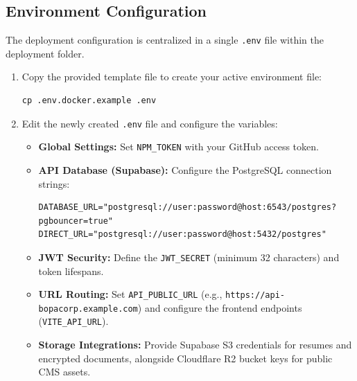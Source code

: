 \documentclass[letterpaper%
, oneside%
, 12pt%
, memoireprojet%
, english%
,creativecommons,hyperref, withAlgo2e %
]{thETS}
\begin{document}
\subsection{Environment Configuration}
The deployment configuration is centralized in a single \texttt{.env} file within the deployment folder.
\begin{enumerate}
\item Copy the provided template file to create your active environment file:
\begin{verbatim}
cp .env.docker.example .env
\end{verbatim}
\item Edit the newly created \texttt{.env} file and configure the variables:
\newline
\begin{itemize}
\item \textbf{Global Settings:} Set \texttt{NPM\_TOKEN} with your GitHub access token.
\item \textbf{API Database (Supabase):} Configure the PostgreSQL connection strings:
\begin{verbatim}
DATABASE_URL="postgresql://user:password@host:6543/postgres?pgbouncer=true"
DIRECT_URL="postgresql://user:password@host:5432/postgres"
\end{verbatim}
\item \textbf{JWT Security:} Define the \texttt{JWT\_SECRET} (minimum 32 characters) and token lifespans.
\item \textbf{URL Routing:} Set \texttt{API\_PUBLIC\_URL} (e.g., \texttt{https://api-bopacorp.example.com}) and configure the frontend endpoints (\texttt{VITE\_API\_URL}).
\item \textbf{Storage Integrations:} Provide Supabase S3 credentials for resumes and encrypted documents, alongside Cloudflare R2 bucket keys for public CMS assets.
\end{itemize}
\end{enumerate}
\end{document}
